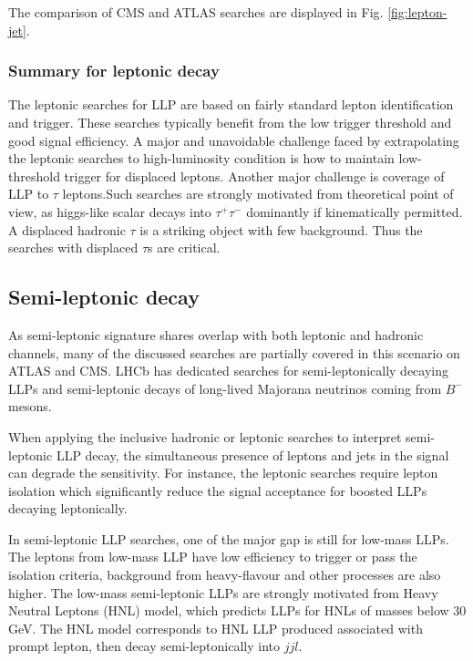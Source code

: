 The comparison of CMS and ATLAS searches are displayed in Fig. \ref{fig:lepton-jet}.


\subsubsection{Summary for leptonic decay}

The leptonic searches for LLP are based on fairly standard lepton identification and trigger. These searches typically benefit from the low trigger threshold  and good signal efficiency. A major and unavoidable challenge faced by extrapolating the leptonic searches to high-luminosity condition is how to maintain low-threshold trigger for displaced leptons. Another major challenge is coverage of LLP to $\tau$ leptons.Such searches are strongly motivated from theoretical point of view, as higgs-like scalar decays into $\tau^+\tau^-$ dominantly if kinematically permitted. A displaced hadronic $\tau$ is a striking object with few background. Thus the searches with displaced $\tau$s are critical.

\subsection{Semi-leptonic decay}

As semi-leptonic signature shares overlap with both leptonic and hadronic channels, many of the discussed searches are partially covered in this scenario on ATLAS and CMS. LHCb has dedicated searches for semi-leptonically decaying LLPs and semi-leptonic decays of long-lived Majorana neutrinos coming from $B^-$ mesons. 

When applying the inclusive hadronic or leptonic searches to interpret semi-leptonic LLP decay, the simultaneous presence of leptons and jets in the signal can degrade the sensitivity. For instance, the leptonic searches require lepton isolation which significantly reduce the signal acceptance for boosted LLPs decaying leptonically. 

In semi-leptonic LLP searches, one of the major gap is still for low-mass LLPs. The leptons from low-mass LLP have low efficiency to trigger or pass the isolation criteria, background from heavy-flavour and other processes are also higher. The low-mass semi-leptonic LLPs are strongly motivated from Heavy Neutral Leptons (HNL) model, which predicts LLPs for HNLs of masses below 30 GeV. The HNL model corresponds to HNL LLP produced associated with prompt lepton, then decay semi-leptonically into $jjl$.

